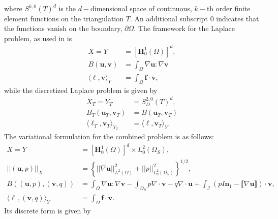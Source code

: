 \documentclass[12pt,a4paper]{article}
\theoremstyle{definition}
\begin{document}
where $S^{k,0}\left(T\right)^d$ is the $d-$dimensional space of continuous, $k-$th order finite element functions on the triangulation $T$.  An additional subscript $0$ indicates that the functions vanish on the boundary, $\partial \Omega$.
The framework for the Laplace problem, as used in \cite[\S 4.2]{verfurth2013posteriori} is 
\begin{equation}\label{frame_laplace}
\begin{aligned}
X=Y&=\left[\textbf{H}^1_0\left(\Omega\right)\right]^d,\\
B\left(\textbf{u},\textbf{v}\right)&=\int_{\Omega}\nabla \textbf{u} : \nabla \textbf{v}\\
\langle \ell,\textbf{v} \rangle_Y &= \int_{\Omega}\textbf{f}\cdot \textbf{v}, 
\end{aligned}
\end{equation}
while the discretized Laplace problem is given by 
\begin{equation}\label{frame_laplace_disc}
\begin{aligned}
X_T=Y_T&=S^{2,0}_D\left(T\right)^d,\\
B_T\left(\textbf{u}_T,\textbf{v}_T\right)&=B\left(\textbf{u}_T,\textbf{v}_T\right)\\
\langle \ell_T,\textbf{v}_T \rangle_{Y_T} &=\langle \ell,\textbf{v}_T \rangle_{Y}.
\end{aligned}
\end{equation}
The variational formulation for the combined problem is as follows:
\begin{equation}\label{frame_combined}
\begin{aligned}
X=Y&=\left[\textbf{H}^1_0\left(\Omega\right)\right]^d\times L^2_0\left(\Omega_S\right),\\
\left|\left|\left(\textbf{u},p\right)\right|\right|_X&=\left\lbrace \left|\left|\nabla\textbf{u}\right|\right|^2_{L^2\left(\Omega\right)} + \left|\left|p\right|\right|^2_{L^2_0\left(\Omega_S\right)}\right\rbrace^{1/2},\\
B\left(\left(\textbf{u},p\right),\left(\textbf{v},q\right)\right)&=\int_{\Omega}\nabla \textbf{u} : \nabla \textbf{v} - \int_{\Omega_S} p \nabla\cdot\textbf{v} -q \nabla\cdot\textbf{u}   +\int_{\mathcal{I}} \left(pI \textbf{n}_1-\llbracket\nabla\textbf{u}\rrbracket\right)\cdot\textbf{v},\\
\langle \ell\,,\left(\textbf{v},q\right) \rangle_Y &= \int_{\Omega}\textbf{f}\cdot \textbf{v}.
\end{aligned}
\end{equation}
Its discrete form is given by
\end{document}
